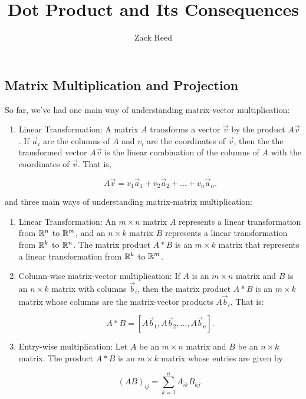 \documentclass{ximera}
\author{Zack Reed}
\title{Dot Product and Its Consequences}
\begin{document}
\begin{abstract}


\end{abstract}
\maketitle

\subsection*{Matrix Multiplication and Projection}

So far, we've had one main way of understanding matrix-vector multiplication:

\begin{enumerate}
   \item Linear Transformation: A matrix $A$ transforms a vector $\vec{v}$ by the product $A\vec{v}$. If $\vec{a}_i$ are the columns of $A$ and $v_i$ are the coordinates of $\vec{v}$, then the the transformed vector $A\vec{v}$ is the linear combination of the columns of $A$ with the coordinates of $\vec{v}$. That is, 
   
   $$A\vec{v}=v_1\vec{a}_1+v_2\vec{a}_2+\ldots+v_n\vec{a}_n.$$
\end{enumerate}

and three main ways of understanding matrix-matrix multiplication:

\begin{enumerate}
   \item Linear Transformation: An $m\times n$ matrix $A$ represents a linear transformation from $\mathbb{R}^n$ to $\mathbb{R}^m$, and an $n\times k$ matrix $B$ represents a linear transformation from $\mathbb{R}^k$ to $\mathbb{R}^n$. The matrix product $A*B$ is an $m\times k$ matrix that represents a linear transformation from $\mathbb{R}^k$ to $\mathbb{R}^m$.
   \item Column-wise matrix-vector multiplication: If $A$ is an $m\times n$ matrix and $B$ is an $n\times k$ matrix with columns $\vec{b}_i$, then the matrix product $A*B$ is an $m\times k$ matrix whose columns are the matrix-vector products $A\vec{b}_i$. That is:
   
   $$A*B=\left[A\vec{b}_1, A\vec{b}_2, \ldots, A\vec{b}_n\right].$$
   \item Entry-wise multiplication: Let $A$ be an $m\times n$ matrix and $B$ be an $n\times k$ matrix. The product $A*B$ is an $m\times k$ matrix whose entries are given by
 
   $$(AB)_{ij}=\sum_{k=1}^n A_{ik}B_{kj}.$$
\end{enumerate}
\end{document}
